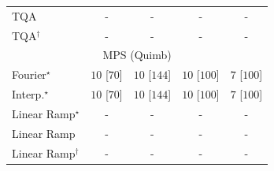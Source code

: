 \begin{tabular}{l|cccc|}
TQA & {\cellcolor[HTML]{000000}} \color[HTML]{F1F1F1} {\cellcolor{white}} \color{black} - & {\cellcolor[HTML]{000000}} \color[HTML]{F1F1F1} {\cellcolor{white}} \color{black} - & {\cellcolor[HTML]{000000}} \color[HTML]{F1F1F1} {\cellcolor{white}} \color{black} - & {\cellcolor[HTML]{000000}} \color[HTML]{F1F1F1} {\cellcolor{white}} \color{black} - \\
TQA$^\dagger$ & {\cellcolor[HTML]{000000}} \color[HTML]{F1F1F1} {\cellcolor{white}} \color{black} - & {\cellcolor[HTML]{000000}} \color[HTML]{F1F1F1} {\cellcolor{white}} \color{black} - & {\cellcolor[HTML]{000000}} \color[HTML]{F1F1F1} {\cellcolor{white}} \color{black} - & {\cellcolor[HTML]{000000}} \color[HTML]{F1F1F1} {\cellcolor{white}} \color{black} - \\
\cline{1-5}
\multicolumn{5}{c}{\rule{0pt}{8pt}MPS (Quimb)} \\
\midrule
Fourier$^\star$ & {\cellcolor[HTML]{00441B}} \color[HTML]{F1F1F1} $10$ [$70$] & {\cellcolor[HTML]{00441B}} \color[HTML]{F1F1F1} $10$ [$144$] & {\cellcolor[HTML]{00441B}} \color[HTML]{F1F1F1} $10$ [$100$] & {\cellcolor[HTML]{37A055}} \color[HTML]{F1F1F1} $7$ [$100$] \\
Interp.$^\star$ & {\cellcolor[HTML]{00441B}} \color[HTML]{F1F1F1} $10$ [$70$] & {\cellcolor[HTML]{00441B}} \color[HTML]{F1F1F1} $10$ [$144$] & {\cellcolor[HTML]{00441B}} \color[HTML]{F1F1F1} $10$ [$100$] & {\cellcolor[HTML]{37A055}} \color[HTML]{F1F1F1} $7$ [$100$] \\
Linear Ramp$^\star$ & {\cellcolor[HTML]{000000}} \color[HTML]{F1F1F1} {\cellcolor{white}} \color{black} - & {\cellcolor[HTML]{000000}} \color[HTML]{F1F1F1} {\cellcolor{white}} \color{black} - & {\cellcolor[HTML]{000000}} \color[HTML]{F1F1F1} {\cellcolor{white}} \color{black} - & {\cellcolor[HTML]{000000}} \color[HTML]{F1F1F1} {\cellcolor{white}} \color{black} - \\
Linear Ramp & {\cellcolor[HTML]{000000}} \color[HTML]{F1F1F1} {\cellcolor{white}} \color{black} - & {\cellcolor[HTML]{000000}} \color[HTML]{F1F1F1} {\cellcolor{white}} \color{black} - & {\cellcolor[HTML]{000000}} \color[HTML]{F1F1F1} {\cellcolor{white}} \color{black} - & {\cellcolor[HTML]{000000}} \color[HTML]{F1F1F1} {\cellcolor{white}} \color{black} - \\
Linear Ramp$^\dagger$ & {\cellcolor[HTML]{000000}} \color[HTML]{F1F1F1} {\cellcolor{white}} \color{black} - & {\cellcolor[HTML]{000000}} \color[HTML]{F1F1F1} {\cellcolor{white}} \color{black} - & {\cellcolor[HTML]{000000}} \color[HTML]{F1F1F1} {\cellcolor{white}} \color{black} - & {\cellcolor[HTML]{000000}} \color[HTML]{F1F1F1} {\cellcolor{white}} \color{black} - \\

\end{tabular}
